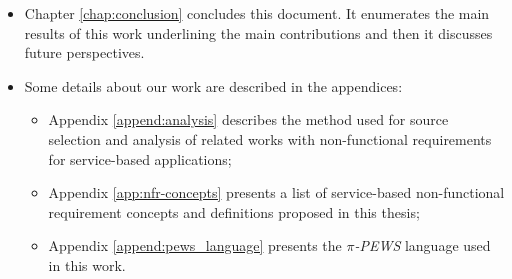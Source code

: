 \begin{itemize}
  \item Chapter \ref{chap:conclusion} concludes this document. It enumerates
  the main results of this work underlining the main contributions and then it
  discusses future perspectives.
  
  \item Some details about our work are described in the appendices:
  \begin{itemize}
    \item Appendix \ref{append:analysis} describes the method used for source
    selection and analysis of related works with non-functional requirements for
    service-based applications;
    \item Appendix \ref{app:nfr-concepts} presents a list of service-based
    non-functional requirement concepts and definitions proposed in this thesis;
    \item Appendix \ref{append:pews_language} presents the \textit{$\pi$-PEWS}
    language used in this work.
  \end{itemize}
\end{itemize}

